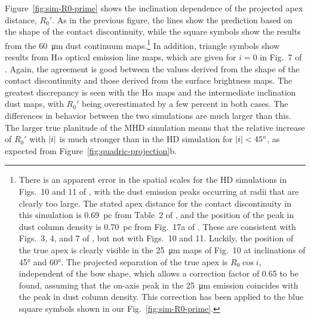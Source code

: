 Figure~\ref{fig:sim-R0-prime} shows the inclination
dependence of the projected apex distance, \(R_0'\).  As in the
previous figure, the lines show the prediction based on the shape of
the contact discontinuity, while the square symbols show the results
from the \SI{60}{\um} dust continuum maps.\footnote{%
  \label{fn:meyer-correction}
  There is an apparent error in the spatial scales for the HD
  simulations in Figs.~10 and 11 of \citet{Meyer:2017a}, with the dust
  emission peaks occurring at radii that are clearly too large.  The
  stated apex distance for the contact discontinuity in this
  simulation is \SI{0.69}{pc} from Table~2 of \citet{Meyer:2014b}, and
  the position of the peak in dust column density is \SI{0.70}{pc}
  from Fig.~17a of \citet{Meyer:2014b}.  These are consistent with
  Figs.~3, 4, and 7 of \citet{Meyer:2017a}, but not with Figs.~10 and
  11.  Luckily, the position of the true apex is clearly visible in
  the \SI{25}{\um} maps of Fig.~10 at inclinations of \ang{45} and
  \ang{60}.  The projected separation of the true apex is
  \(R_0 \cos i\), independent of the bow shape, which allows a
  correction factor of \num{0.65} to be found, assuming that the
  on-axis peak in the \SI{25}{\um} emission coincides with the peak in
  dust column density.  This correction has been applied to the blue
  square symbols shown in our Fig.~\ref{fig:sim-R0-prime}.} %
In addition, triangle symbols show results from H\(\alpha\) optical
emission line maps, which are given for \(i = 0\) in Fig.~7 of
\citet{Meyer:2017a}.  Again, the agreement is good between the values
derived from the shape of the contact discontinuity and those derived
from the surface brightness maps. The greatest discrepancy is seen
with the H\(\alpha\) maps and the intermediate inclination dust maps, with
\(R_0'\) being overestimated by a few percent in both cases.  The
differences in behavior between the two simulations are much larger
than this.  The larger true planitude of the MHD simulation means that
the relative increase of \(R_0'\) with \(\lvert i\rvert\) is much stronger
than in the HD simulation for \(\lvert i\rvert < \ang{45}\), as expected from
Figure~\ref{fig:quadric-projection}b.

